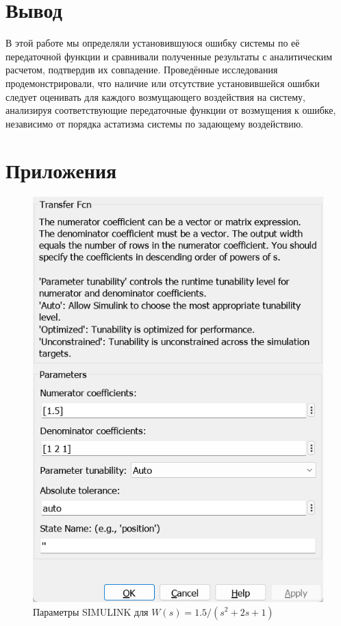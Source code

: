 \documentclass[a4paper, 12pt]{article}
\begin{document}
    \section{Вывод}
    В этой работе мы определяли установившуюся ошибку системы
    по её передаточной функции и сравнивали полученные результаты
    с аналитическим расчетом, подтвердив их совпадение.
    Проведённые исследования продемонстрировали,
    что наличие или отсутствие установившейся ошибки
    следует оценивать для каждого возмущающего воздействия
    на систему, анализируя соответствующие передаточные
    функции от возмущения к ошибке, независимо от порядка
    астатизма системы по задающему воздействию.


    \section{Приложения}
    \begin{figure}[H]
        \centering
        \includegraphics[scale=0.6]{task1_tfcn_window.png}
        \captionsetup{skip=0pt}
        \caption{Параметры SIMULINK для $W(s)=1.5/(s^2+2s+1)$}
        \label{fig:task1_tfcn_window}
    \end{figure}
\end{document}
